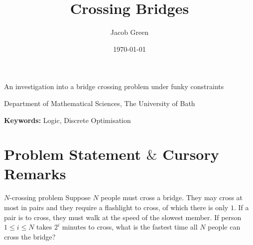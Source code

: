 \documentclass{article}
\title{Crossing Bridges}
\author{Jacob Green}
\date{\today}
\newcommand{\subtitle}{An investigation into a bridge crossing problem under funky constraints}
\newcommand{\institution}{Department of Mathematical Sciences, The University of Bath}
\newcommand{\keywords}{Logic, Discrete Optimisation}
\newcounter{definitioncount} %
\newcounter{lemmacount}
\newcounter{examplecount}
\newcounter{theoremcount}
\newcounter{propositioncount}
\newcounter{corollarycount}
\newcounter{remarkcount}
\begin{document}
\begin{titlepage}
    \centering
    
    {\Huge \bfseries \thetitle \par}
    \vspace{0.5cm}
    
    {\Large \subtitle \par}
    \vspace{1cm}
    
    {\large \theauthor \par}
    {\institution \par}
    \vspace{1cm}
    
    {\large \thedate \par}
    \vspace{1.5cm}
    
    \begin{abstract}
        \lipsum[10]
    \end{abstract}
    \vspace{1cm}
    
    \textbf{Keywords:} \keywords
    \vfill %
    
    \textit{}
\end{titlepage}

\newpage 

\setcounter{page}{1} %

\section{Problem Statement $\&$ Cursory Remarks}

\setcounter{lemmacount}{1}
\setcounter{examplecount}{1}
\setcounter{theoremcount}{1}
\setcounter{propositioncount}{1}
\setcounter{corollarycount}{1}
\setcounter{remarkcount}{1}
\setcounter{definitioncount}{1}

\begin{problem}[]{$N$-crossing problem}
    Suppose $N$ people must cross a bridge. They may cross at most in pairs and they require a flashlight to cross, 
    of which there is only $1$. If a pair is to cross, they must walk at the speed of the slowest member. If person 
    $1 \leq i \leq N$ takes $2^i$ minutes to cross, what is the fastest time all $N$ people can cross the bridge? 
\end{problem}
\end{document}
